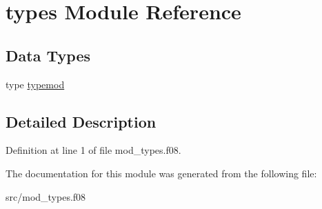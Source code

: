\hypertarget{classtypes}{\section{types Module Reference}
\label{classtypes}
}
\subsection*{Data Types}
\begin{DoxyCompactItemize}
\item 
type \hyperlink{structtypes_1_1typemod}{typemod}
\end{DoxyCompactItemize}


\subsection{Detailed Description}


Definition at line 1 of file mod\-\_\-types.\-f08.



The documentation for this module was generated from the following file\-:\begin{DoxyCompactItemize}
\item 
src/mod\-\_\-types.\-f08\end{DoxyCompactItemize}
